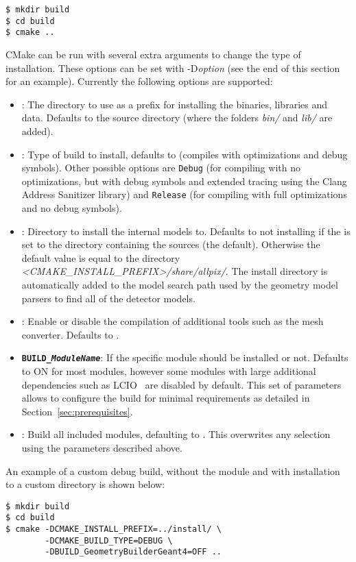 \begin{verbatim}
$ mkdir build
$ cd build
$ cmake ..
\end{verbatim}

CMake can be run with several extra arguments to change the type of installation.
These options can be set with -D\textit{option} (see the end of this section for an example).
Currently the following options are supported:
\begin{itemize}
\item {}: The directory to use as a prefix for installing the binaries, libraries and data.
Defaults to the source directory (where the folders \textit{bin/} and \textit{lib/} are added).
\item {}: Type of build to install, defaults to  (compiles with optimizations and debug symbols).
Other possible options are \texttt{Debug} (for compiling with no optimizations, but with debug symbols and extended tracing using the Clang Address Sanitizer library) and \texttt{Release} (for compiling with full optimizations and no debug symbols).
\item {}: Directory to install the internal models to.
Defaults to not installing if the  is set to the directory containing the sources (the default).
Otherwise the default value is equal to the directory \textit{<CMAKE\_INSTALL\_PREFIX>/share/allpix/}.
The install directory is automatically added to the model search path used by the geometry model parsers to find all of the detector models.
\item {}: Enable or disable the compilation of additional tools such as the mesh converter. Defaults to .
\item \textbf{\texttt{BUILD\_\textit{ModuleName}}}: If the specific module  should be installed or not.
Defaults to ON for most modules, however some modules with large additional dependencies such as LCIO~\cite{lcio} are disabled by default.
This set of parameters allows to configure the build for minimal requirements as detailed in Section~\ref{sec:prerequisites}.
\item {}: Build all included modules, defaulting to .
This overwrites any selection using the parameters described above.
\end{itemize}

An example of a custom debug build, without the  module and with installation to a custom directory is shown below:
\begin{verbatim}
$ mkdir build
$ cd build
$ cmake -DCMAKE_INSTALL_PREFIX=../install/ \
        -DCMAKE_BUILD_TYPE=DEBUG \
        -DBUILD_GeometryBuilderGeant4=OFF ..
\end{verbatim}

